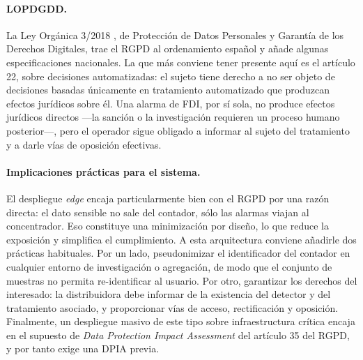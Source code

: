 \paragraph{LOPDGDD.} La Ley Orgánica 3/2018 \cite{lopdgdd2018}, de Protección de Datos Personales y Garantía de los Derechos Digitales, trae el RGPD al ordenamiento español y añade algunas especificaciones nacionales. La que más conviene tener presente aquí es el artículo 22, sobre decisiones automatizadas: el sujeto tiene derecho a no ser objeto de decisiones basadas únicamente en tratamiento automatizado que produzcan efectos jurídicos sobre él. Una alarma de FDI, por sí sola, no produce efectos jurídicos directos ---la sanción o la investigación requieren un proceso humano posterior---, pero el operador sigue obligado a informar al sujeto del tratamiento y a darle vías de oposición efectivas.

\paragraph{Implicaciones prácticas para el sistema.} El despliegue \textit{edge} encaja particularmente bien con el RGPD por una razón directa: el dato sensible no sale del contador, sólo las alarmas viajan al concentrador. Eso constituye una minimización por diseño, lo que reduce la exposición y simplifica el cumplimiento. A esta arquitectura conviene añadirle dos prácticas habituales. Por un lado, pseudonimizar el identificador del contador en cualquier entorno de investigación o agregación, de modo que el conjunto de muestras no permita re-identificar al usuario. Por otro, garantizar los derechos del interesado: la distribuidora debe informar de la existencia del detector y del tratamiento asociado, y proporcionar vías de acceso, rectificación y oposición. Finalmente, un despliegue masivo de este tipo sobre infraestructura crítica encaja en el supuesto de \textit{Data Protection Impact Assessment} del artículo 35 del RGPD, y por tanto exige una DPIA previa.

